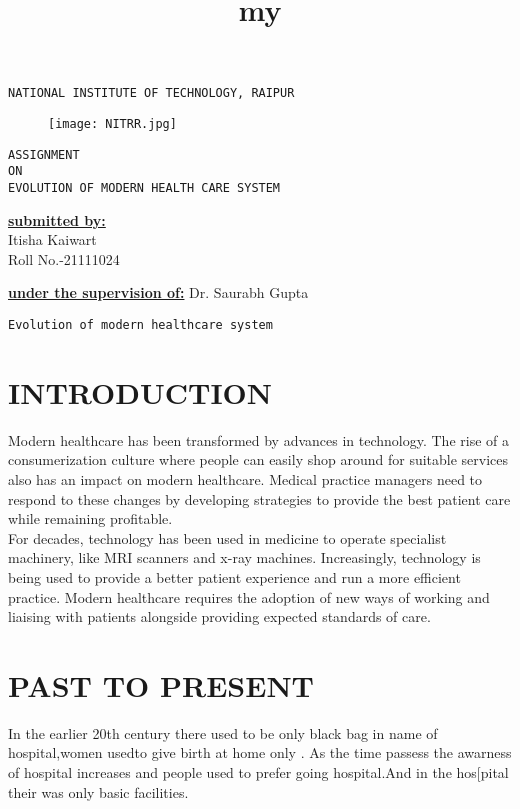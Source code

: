 \documentclass[12pt]{article}
\title{my}
\begin{document}
\centering\huge\texttt{NATIONAL INSTITUTE OF TECHNOLOGY, RAIPUR}\\

\begin{figure}[h]
\centering
\texttt{[image: NITRR.jpg]}
\end{figure}

\begin{center}


\huge\texttt{ASSIGNMENT \\ON\\ EVOLUTION OF MODERN HEALTH CARE SYSTEM}

\end{center}

\begin{minipage}[t]{5cm}


\flushleft\Large\textbf{\underline{submitted by:}}\\
Itisha Kaiwart\\
Roll No.-21111024
\end{minipage}
\hfill
\begin{minipage}[t]{5cm}


\Large\textbf{\underline{under the supervision of:}}
Dr. Saurabh Gupta
\end{minipage}
\pagebreak
\tableofcontents
\pagebreak

\huge\texttt{Evolution of modern healthcare system}
\flushleft\section{\large\textbf{INTRODUCTION}}
   
\large Modern healthcare has been transformed by advances in technology. The rise of a consumerization culture where people can easily shop around for suitable services also has an impact on modern healthcare. Medical practice managers need to respond to these changes by developing strategies to provide the best patient care while remaining profitable.\\

For decades, technology has been used in medicine to operate specialist machinery, like MRI scanners and x-ray machines. Increasingly, technology is being used to provide a better patient experience and run a more efficient practice. Modern healthcare requires the adoption of new ways of working and liaising with patients alongside providing expected standards of care.

\flushleft\section{\large\textbf{PAST TO PRESENT}}
In the earlier 20th century there used to be only black bag in name of hospital,women usedto give birth at home only . As the time passess the awarness of hospital increases and people used to prefer going hospital.And in the hos[pital their was only basic facilities.
\end{document}
